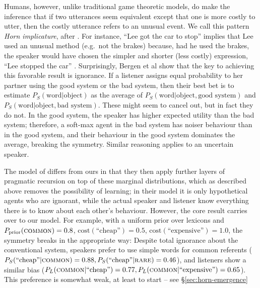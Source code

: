 \documentclass{article} %
\newcommand{\word}{\text{word}}
\newcommand{\obj}{\text{object}}
\begin{document}
Humans, however, unlike traditional game theoretic models, do make the inference that if two utterances seem equivalent except that one is more costly to utter, then the costly utterance refers to an unusual event. We call this pattern \textit{Horn implicature}, after \cite{horn1984}. For instance, ``Lee got the car to stop'' implies that Lee used an unusual method (e.g.~not the brakes) because, had he used the brakes, the speaker would have chosen the simpler and shorter (less costly) expression, ``Lee stopped the car'' \cite{horn1984}. Surprisingly, Bergen et al \cite{bergen2012} show that the key to achieving this favorable result is ignorance. If a listener assigns equal probability to her partner using the good system or the bad system, then their best bet is to estimate $P_S(\word | \obj)$ as the average of $P_S(\word | \obj, \text{good system})$ and $P_S(\word | \obj, \text{bad system})$. These might seem to cancel out, but in fact they do not. In the good system, the speaker has higher expected utility than the bad system; therefore, a soft-max agent in the bad system has noiser behaviour than in the good system, and their behaviour in the good system dominates the average, breaking the symmetry. Similar reasoning applies to an uncertain speaker.


%
%

The model of \cite{bergen2012} differs from ours in that they then apply further layers of pragmatic recursion on top of these marginal distributions, which as described above removes the possibility of learning; in their model it is only hypothetical agents who are ignorant, while the actual speaker and listener know everything there is to know about each other's behaviour. However, the core result carries over to our model. For example, with a uniform prior over lexicons and $P_\text{prior}(\text{\textsc{common}}) = 0.8$, $\text{cost}(\text{``cheap''}) = 0.5$, $\text{cost}(\text{``expensive''}) = 1.0$, the symmetry breaks in the appropriate way: Despite total ignorance about the conventional system, speakers prefer to use simple words for common referents ($P_S(\text{``cheap''} | \text{\textsc{common}}) = 0.88, P_S(\text{``cheap''} | \text{\textsc{rare}}) = 0.46$), and listeners show a similar bias ($P_L(\text{\textsc{common}} | \text{``cheap''}) = 0.77, P_L(\text{\textsc{common}} | \text{``expensive''}) = 0.65$). This preference is somewhat weak, at least to start -- see \S\ref{sec:horn-emergence}
\end{document}
